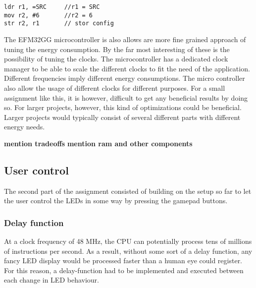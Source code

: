 \begin{lstlisting}
ldr r1, =SRC     //r1 = SRC
mov r2, #6       //r2 = 6         
str r2, r1       // stor config  
\end{lstlisting}

     

The EFM32GG microcontroller is also allows are more fine grained approach of tuning the energy consumption. By the far most interesting of these is the possibility of tuning the clocks. The microcontroller has a dedicated clock manager to be able to scale the different clocks to fit the need of the application. Different frequencies imply different energy consumptions. The micro controller also allow the usage of different clocks for different purposes. For a small assignment like this, it is however, difficult to get any beneficial results by doing so. For larger projects, however, this kind of optimizations could be beneficial. Larger projects would typically consist of several different parts with different energy needs. 

{\bf mention  tradeoffs}
{\bf mention ram and other components}   




  
\subsection{User control}

The second part of the assignment consisted of building on the setup so far to let the user control the LEDs in some way by pressing the gamepad buttons.

\subsubsection{Delay function}

At a clock frequency of 48 MHz, the CPU can potentially process tens of millions of instructions per second. As a result, without some sort of a delay function, any fancy LED display would be processed faster than a human eye could register. For this reason, a delay-function had to be implemented and executed between each change in LED behaviour.

